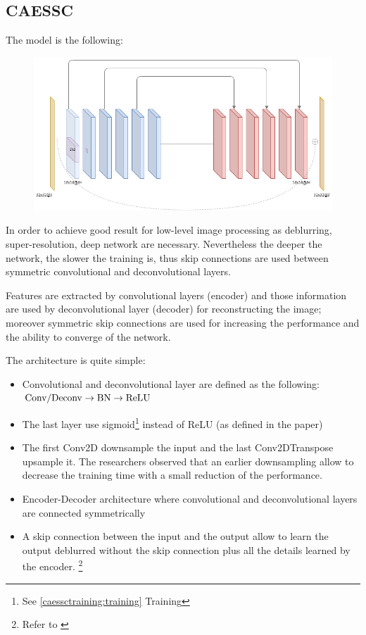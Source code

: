 \subsection{CAESSC}
The model is the following:
\begin{figure}[H]
    \centering
    \includegraphics[scale=0.4]{subsections/caessc/caessc.png}
\end{figure}

In order to achieve good result for low-level image processing as deblurring, super-resolution, deep network are necessary.
Nevertheless the deeper the network, the slower the training is, thus skip connections are used between symmetric convolutional and deconvolutional layers.

Features are extracted by convolutional layers (encoder) and those information are used by deconvolutional layer (decoder) for reconstructing the image; moreover symmetric  skip connections are used for increasing the performance and the ability to converge of the network.

The architecture is quite simple:
\begin{itemize}
    \item Convolutional and deconvolutional layer are defined as the following: $\textnormal{Conv/Deconv} \rightarrow \textnormal{BN} \rightarrow \textnormal{ReLU}$
    \item The last layer use sigmoid\footnote{See \ref{caessctraining:training} Training} instead of ReLU (as defined in the paper)
    \item The first Conv2D downsample the input and the last Conv2DTranspose upsample it.
    The researchers observed that an earlier downsampling allow to decrease the training time with a small reduction of the performance.
    \item Encoder-Decoder architecture where convolutional and deconvolutional layers are connected symmetrically
    \item A skip connection between the input and the output allow to learn the output deblurred without the skip connection plus all the details learned by the encoder. \footnote{Refer to \cite[4.1 Analysis of the architecture]{CAESSC}} 
\end{itemize}

